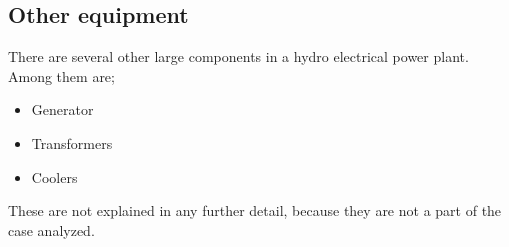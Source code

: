     \subsection{Other equipment}
        There are several other large components in a hydro electrical power plant. Among them are;
        \begin{itemize}
            \item Generator
            \item Transformers
            \item Coolers
        \end{itemize}
        These are not explained in any further detail, because they are not a part of the case analyzed. 


